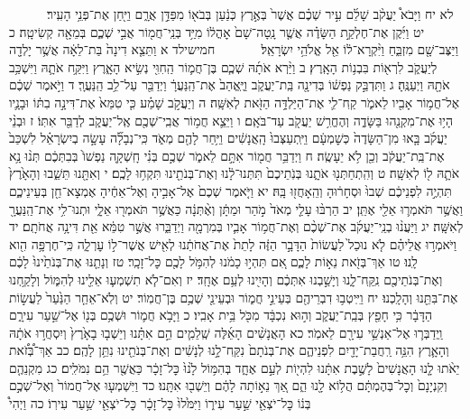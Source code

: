 \documentclass[twoside, openany, parskip=half, 11pt]{book}
\begin{document}
　　　לא יח וַיָּבֹא֩ יַעֲקֹ֨ב שָׁלֵ֜ם עִ֣יר שְׁכֶ֗ם אֲשֶׁר֙ בְּאֶ֣רֶץ כְּנַ֔עַן בְּבֹא֖וֹ מִפַּדַּ֣ן אֲרָ֑ם וַיִּ֖חַן אֶת־פְּנֵ֥י הָעִֽיר׃ יט וַיִּ֜קֶן אֶת־חֶלְקַ֣ת הַשָּׂדֶ֗ה אֲשֶׁ֤ר נָֽטָה־שָׁם֙ אׇהֳל֔וֹ מִיַּ֥ד בְּנֵֽי־חֲמ֖וֹר אֲבִ֣י שְׁכֶ֑ם בְּמֵאָ֖ה קְשִׂיטָֽה׃ כ וַיַּצֶּב־שָׁ֖ם מִזְבֵּ֑חַ וַיִּ֨קְרָא־ל֔וֹ אֵ֖ל אֱלֹהֵ֥י יִשְׂרָאֵֽל׃
　　　 חמישילד א וַתֵּצֵ֤א דִינָה֙ בַּת־לֵאָ֔ה אֲשֶׁ֥ר יָלְדָ֖ה לְיַעֲקֹ֑ב לִרְא֖וֹת בִּבְנ֥וֹת הָאָֽרֶץ׃ ב וַיַּ֨רְא אֹתָ֜הּ שְׁכֶ֧ם בֶּן־חֲמ֛וֹר הַֽחִוִּ֖י נְשִׂ֣יא הָאָ֑רֶץ וַיִּקַּ֥ח אֹתָ֛הּ וַיִּשְׁכַּ֥ב אֹתָ֖הּ וַיְעַנֶּֽהָ׃ ג וַתִּדְבַּ֣ק נַפְשׁ֔וֹ בְּדִינָ֖ה בַּֽת־יַעֲקֹ֑ב וַיֶּֽאֱהַב֙ אֶת־הַֽנַּעֲרָ֔ וַיְדַבֵּ֖ר עַל־לֵ֥ב הַֽנַּעֲרָֽ׃ ד וַיֹּ֣אמֶר שְׁכֶ֔ם אֶל־חֲמ֥וֹר אָבִ֖יו לֵאמֹ֑ר קַֽח־לִ֛י אֶת־הַיַּלְדָּ֥ה הַזֹּ֖את לְאִשָּֽׁה׃ ה וְיַעֲקֹ֣ב שָׁמַ֗ע כִּ֤י טִמֵּא֙ אֶת־דִּינָ֣ה בִתּ֔וֹ וּבָנָ֛יו הָי֥וּ אֶת־מִקְנֵ֖הוּ בַּשָּׂדֶ֑ה וְהֶחֱרִ֥שׁ יַעֲקֹ֖ב עַד־בֹּאָֽם׃ ו וַיֵּצֵ֛א חֲמ֥וֹר אֲבִֽי־שְׁכֶ֖ם אֶֽל־יַעֲקֹ֑ב לְדַבֵּ֖ר אִתּֽוֹ׃ ז וּבְנֵ֨י יַעֲקֹ֜ב בָּ֤אוּ מִן־הַשָּׂדֶה֙ כְּשׇׁמְעָ֔ם וַיִּֽתְעַצְּבוּ֙ הָֽאֲנָשִׁ֔ים וַיִּ֥חַר לָהֶ֖ם מְאֹ֑ד כִּֽי־נְבָלָ֞ה עָשָׂ֣ה בְיִשְׂרָאֵ֗ל לִשְׁכַּב֙ אֶת־בַּֽת־יַעֲקֹ֔ב וְכֵ֖ן לֹ֥א יֵעָשֶֽׂה׃ ח וַיְדַבֵּ֥ר חֲמ֖וֹר אִתָּ֣ם לֵאמֹ֑ר שְׁכֶ֣ם בְּנִ֗י חָֽשְׁקָ֤ה נַפְשׁוֹ֙ בְּבִתְּכֶ֔ם תְּנ֨וּ נָ֥א אֹתָ֛הּ ל֖וֹ לְאִשָּֽׁה׃ ט וְהִֽתְחַתְּנ֖וּ אֹתָ֑נוּ בְּנֹֽתֵיכֶם֙ תִּתְּנוּ־לָ֔נוּ וְאֶת־בְּנֹתֵ֖ינוּ תִּקְח֥וּ לָכֶֽם׃ י וְאִתָּ֖נוּ תֵּשֵׁ֑בוּ וְהָאָ֙רֶץ֙ תִּהְיֶ֣ה לִפְנֵיכֶ֔ם שְׁבוּ֙ וּסְחָר֔וּהָ וְהֵֽאָחֲז֖וּ בָּֽהּ׃ יא וַיֹּ֤אמֶר שְׁכֶם֙ אֶל־אָבִ֣יהָ וְאֶל־אַחֶ֔יהָ אֶמְצָא־חֵ֖ן בְּעֵינֵיכֶ֑ם וַאֲשֶׁ֥ר תֹּאמְר֛וּ אֵלַ֖י אֶתֵּֽן׃ יב הַרְבּ֨וּ עָלַ֤י מְאֹד֙ מֹ֣הַר וּמַתָּ֔ן וְאֶ֨תְּנָ֔ה כַּאֲשֶׁ֥ר תֹּאמְר֖וּ אֵלָ֑י וּתְנוּ־לִ֥י אֶת־הַֽנַּעֲרָ֖ לְאִשָּֽׁה׃ יג וַיַּעֲנ֨וּ בְנֵֽי־יַעֲקֹ֜ב אֶת־שְׁכֶ֨ם וְאֶת־חֲמ֥וֹר אָבִ֛יו בְּמִרְמָ֖ה וַיְדַבֵּ֑רוּ אֲשֶׁ֣ר טִמֵּ֔א אֵ֖ת דִּינָ֥ה אֲחֹתָֽם׃ יד וַיֹּאמְר֣וּ אֲלֵיהֶ֗ם לֹ֤א נוּכַל֙ לַעֲשׂוֹת֙ הַדָּבָ֣ר הַזֶּ֔ה לָתֵת֙ אֶת־אֲחֹתֵ֔נוּ לְאִ֖ישׁ אֲשֶׁר־ל֣וֹ עׇרְלָ֑ה כִּֽי־חֶרְפָּ֥ה הִ֖וא לָֽנוּ׃ טו אַךְ־בְּזֹ֖את נֵא֣וֹת לָכֶ֑ם אִ֚ם תִּהְי֣וּ כָמֹ֔נוּ לְהִמֹּ֥ל לָכֶ֖ם כׇּל־זָכָֽר׃ טז וְנָתַ֤נּוּ אֶת־בְּנֹתֵ֙ינוּ֙ לָכֶ֔ם וְאֶת־בְּנֹתֵיכֶ֖ם נִֽקַּֽח־לָ֑נוּ וְיָשַׁ֣בְנוּ אִתְּכֶ֔ם וְהָיִ֖ינוּ לְעַ֥ם אֶחָֽד׃ יז וְאִם־לֹ֧א תִשְׁמְע֛וּ אֵלֵ֖ינוּ לְהִמּ֑וֹל וְלָקַ֥חְנוּ אֶת־בִּתֵּ֖נוּ וְהָלָֽכְנוּ׃ יח וַיִּֽיטְב֥וּ דִבְרֵיהֶ֖ם בְּעֵינֵ֣י חֲמ֑וֹר וּבְעֵינֵ֖י שְׁכֶ֥ם בֶּן־חֲמֽוֹר׃ יט וְלֹֽא־אֵחַ֤ר הַנַּ֙עַר֙ לַעֲשׂ֣וֹת הַדָּבָ֔ר כִּ֥י חָפֵ֖ץ בְּבַֽת־יַעֲקֹ֑ב וְה֣וּא נִכְבָּ֔ד מִכֹּ֖ל בֵּ֥ית אָבִֽיו׃ כ וַיָּבֹ֥א חֲמ֛וֹר וּשְׁכֶ֥ם בְּנ֖וֹ אֶל־שַׁ֣עַר עִירָ֑ם וַֽיְדַבְּר֛וּ אֶל־אַנְשֵׁ֥י עִירָ֖ם לֵאמֹֽר׃ כא הָאֲנָשִׁ֨ים הָאֵ֜לֶּה שְֽׁלֵמִ֧ים הֵ֣ם אִתָּ֗נוּ וְיֵשְׁב֤וּ בָאָ֙רֶץ֙ וְיִסְחֲר֣וּ אֹתָ֔הּ וְהָאָ֛רֶץ הִנֵּ֥ה רַֽחֲבַת־יָדַ֖יִם לִפְנֵיהֶ֑ם אֶת־בְּנֹתָם֙ נִקַּֽח־לָ֣נוּ לְנָשִׁ֔ים וְאֶת־בְּנֹתֵ֖ינוּ נִתֵּ֥ן לָהֶֽם׃ כב אַךְ־בְּ֠זֹ֠את יֵאֹ֨תוּ לָ֤נוּ הָאֲנָשִׁים֙ לָשֶׁ֣בֶת אִתָּ֔נוּ לִהְי֖וֹת לְעַ֣ם אֶחָ֑ד בְּהִמּ֥וֹל לָ֙נוּ֙ כׇּל־זָכָ֔ר כַּאֲשֶׁ֖ר הֵ֥ם נִמֹּלִֽים׃ כג מִקְנֵהֶ֤ם וְקִנְיָנָם֙ וְכׇל־בְּהֶמְתָּ֔ם הֲל֥וֹא לָ֖נוּ הֵ֑ם אַ֚ךְ נֵא֣וֹתָה לָהֶ֔ם וְיֵשְׁב֖וּ אִתָּֽנוּ׃ כד וַיִּשְׁמְע֤וּ אֶל־חֲמוֹר֙ וְאֶל־שְׁכֶ֣ם בְּנ֔וֹ כׇּל־יֹצְאֵ֖י שַׁ֣עַר עִיר֑וֹ וַיִּמֹּ֙לוּ֙ כׇּל־זָכָ֔ר כׇּל־יֹצְאֵ֖י שַׁ֥עַר עִירֽוֹ׃ כה וַיְהִי֩ 
\end{document}
